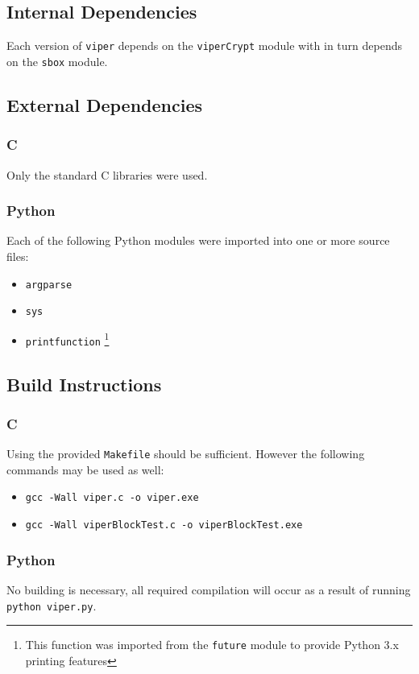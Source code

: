 \subsection{Internal Dependencies}
Each version of \texttt{viper} depends on the \texttt{viperCrypt} module with in turn depends on the \texttt{sbox} module.

\subsection{External Dependencies}
\subsubsection{C}
Only the standard C libraries were used.
\subsubsection{Python}
Each of the following Python modules were imported into one or more source files:
\begin{itemize}
\item \texttt{argparse}
\item \texttt{sys}
\item \texttt{print{\textunderscore}function} \footnote{This function was imported from the \texttt{future} module to provide Python 3.x printing features}
\end{itemize}

\subsection{Build Instructions}
\subsubsection{C}
Using the provided \texttt{Makefile} should be sufficient. However the following commands may be used as well:
\begin{itemize}
\item \texttt{gcc -Wall viper.c -o viper.exe}
\item \texttt{gcc -Wall viperBlockTest.c -o viperBlockTest.exe}
\end{itemize}

\subsubsection{Python}
No building is necessary, all required compilation will occur as a result of running \texttt{python viper.py}.
